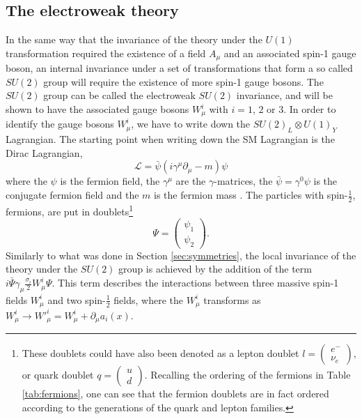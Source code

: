 \subsection*{The electroweak theory} 
\noindent\justify
In the same way that the invariance of the theory under the $U(1)$ transformation required the existence of a field $A_{\mu}$ and an associated spin-1 gauge boson, an internal invariance under a set of transformations that form a so called $SU(2)$ group will require the existence of more spin-1 gauge bosons. 
The $SU(2)$ group can be called the electroweak $SU(2)$ invariance, and will be shown to have the associated gauge bosons $W_{\mu}^{i}$ with $i=1$, $2$ or $3$.
In order to identify the gauge bosons $W_{\mu}^{i}$, we have to write down the $SU(2)_{L}\otimes U(1)_{Y}$ Lagrangian. 
The starting point when writing down the SM Lagrangian is the Dirac Lagrangian, 
\begin{equation}
\mathcal{L}=\bar{\psi}(i\gamma^{\mu}\partial_{\mu}-m)\psi
\end{equation}                                               
where the $\psi$ is the fermion field, the $\gamma^{\mu}$ are the $\gamma$-matrices, the $\bar{\psi}=\gamma^{0}\psi$ is the conjugate fermion field and the $m$ is the fermion mass \cite{Kane:2244793}.
The particles with spin-$\frac{1}{2}$, fermions, are put in doublets\footnote{These doublets could have also been denoted as a lepton doublet $l=\begin{pmatrix} e^{-}\\ \nu_{e} \end{pmatrix}$, or quark doublet $q=\begin{pmatrix} u\\ d \end{pmatrix}$. Recalling the ordering of the fermions in Table \ref{tab:fermions}, one can see that the fermion doublets are in fact ordered according to the generations of the quark and lepton families. }
\begin{equation}
\Psi=\begin{pmatrix} \psi_{1}\\ \psi_{2} \end{pmatrix}.
\end{equation}
Similarly to what was done in Section \ref{sec:symmetries}, the local invariance of the theory under the $SU(2)$ group is achieved by the addition of the term $i\bar{\Psi}\gamma_{\mu}\frac{\sigma_{i}}{2}W_{\mu}^{i}\Psi$. 
This term describes the interactions between three massive spin-1 fields $W^{i}_{\mu}$ and two spin-$\frac{1}{2}$ fields, where the $W^{i}_{\mu}$ transforms as $W^{i}_{\mu}\rightarrow W'^{i}_{\mu}=W^{i}_{\mu}+\partial_{\mu}a_{i}(x)$. 
